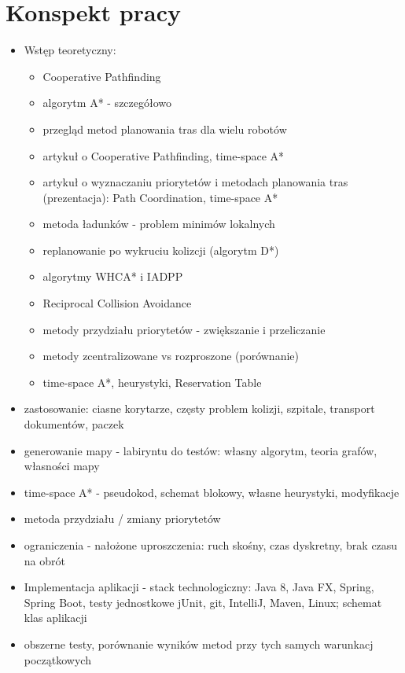 \chapter{Konspekt pracy}
\label{ch:konspekt}
\begin{itemize}
	\item Wstęp teoretyczny:
	\begin{itemize}
		\item Cooperative Pathfinding
		\item algorytm A* - szczegółowo
		\item przegląd metod planowania tras dla wielu robotów
		\item artykuł o Cooperative Pathfinding, time-space A*
		\item artykuł o wyznaczaniu priorytetów i metodach planowania tras (prezentacja): Path Coordination, time-space A*
		\item metoda ładunków - problem minimów lokalnych
		\item replanowanie po wykruciu kolizcji (algorytm D*)
		\item algorytmy WHCA* i IADPP
		\item Reciprocal Collision Avoidance
		\item metody przydziału priorytetów - zwiększanie i przeliczanie
		\item metody zcentralizowane vs rozproszone (porównanie)
		\item time-space A*, heurystyki, Reservation Table
	\end{itemize}
	\item zastosowanie: ciasne korytarze, częsty problem kolizji, szpitale, transport dokumentów, paczek
	\item generowanie mapy - labiryntu do testów: własny algorytm, teoria grafów, własności mapy
	\item time-space A* - pseudokod, schemat blokowy, własne heurystyki, modyfikacje
	\item metoda przydziału / zmiany priorytetów
	\item ograniczenia - nałożone uproszczenia: ruch skośny, czas dyskretny, brak czasu na obrót
	\item Implementacja aplikacji - stack technologiczny: Java 8, Java FX, Spring, Spring Boot, testy jednostkowe jUnit, git, IntelliJ, Maven, Linux; schemat klas aplikacji
	\item obszerne testy, porównanie wyników metod przy tych samych warunkacj początkowych
\end{itemize}